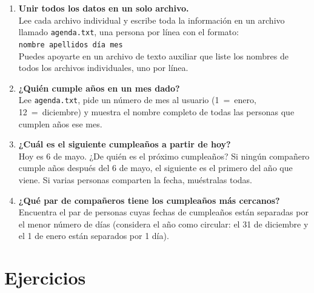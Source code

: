 \documentclass[12pt, oneside]{article}
\begin{document}
\begin{enumerate}

  \item \textbf{Unir todos los datos en un solo archivo.}\\
        Lee cada archivo individual y escribe toda la información en un
        archivo llamado \texttt{agenda.txt}, una persona por línea con el
        formato:\\[4pt]
        \texttt{nombre apellidos día mes}\\[4pt]
        Puedes apoyarte en un archivo de texto auxiliar que liste los
        nombres de todos los archivos individuales, uno por línea.

  \item \textbf{¿Quién cumple años en un mes dado?}\\
        Lee \texttt{agenda.txt}, pide un número de mes al usuario (1~=~enero,
        12~=~diciembre) y muestra el nombre completo de todas las personas
        que cumplen años ese mes.

  \item \textbf{¿Cuál es el siguiente cumpleaños a partir de hoy?}\\
        Hoy es 6 de mayo.  ¿De quién es el próximo cumpleaños?  Si ningún
        compañero cumple años después del 6 de mayo, el siguiente es el
        primero del año que viene.  Si varias personas comparten la fecha,
        muéstralas todas.

  \item \textbf{¿Qué par de compañeros tiene los cumpleaños más cercanos?}\\
        Encuentra el par de personas cuyas fechas de cumpleaños están
        separadas por el menor número de días (considera el año como circular:
        el 31 de diciembre y el 1 de enero están separados por 1 día).

\end{enumerate}

\section{Ejercicios}
\end{document}
